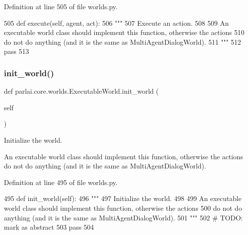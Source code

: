 Definition at line 505 of file worlds.\+py.


\begin{DoxyCode}
505     \textcolor{keyword}{def }execute(self, agent, act):
506         \textcolor{stringliteral}{"""}
507 \textcolor{stringliteral}{        Execute an action.}
508 \textcolor{stringliteral}{}
509 \textcolor{stringliteral}{        An executable world class should implement this function, otherwise the actions}
510 \textcolor{stringliteral}{        do not do anything (and it is the same as MultiAgentDialogWorld).}
511 \textcolor{stringliteral}{        """}
512         \textcolor{keywordflow}{pass}
513 
\end{DoxyCode}
\mbox{\label{classparlai_1_1core_1_1worlds_1_1ExecutableWorld_a8bb31ec1d93a94cb261f89ce0992159a}} 
\subsubsection{\texorpdfstring{init\+\_\+world()}{init\_world()}}
{\footnotesize\ttfamily def parlai.\+core.\+worlds.\+Executable\+World.\+init\+\_\+world (\begin{DoxyParamCaption}\item[{}]{self }\end{DoxyParamCaption})}

\begin{DoxyVerb}Initialize the world.

An executable world class should implement this function, otherwise the actions
do not do anything (and it is the same as MultiAgentDialogWorld).
\end{DoxyVerb}
 

Definition at line 495 of file worlds.\+py.


\begin{DoxyCode}
495     \textcolor{keyword}{def }init\_world(self):
496         \textcolor{stringliteral}{"""}
497 \textcolor{stringliteral}{        Initialize the world.}
498 \textcolor{stringliteral}{}
499 \textcolor{stringliteral}{        An executable world class should implement this function, otherwise the actions}
500 \textcolor{stringliteral}{        do not do anything (and it is the same as MultiAgentDialogWorld).}
501 \textcolor{stringliteral}{        """}
502         \textcolor{comment}{# TODO: mark as abstract}
503         \textcolor{keywordflow}{pass}
504 
\end{DoxyCode}
\mbox{\label{classparlai_1_1core_1_1worlds_1_1ExecutableWorld_a69934ec2181a8b22269e02ab8b3bb1f2}} 
